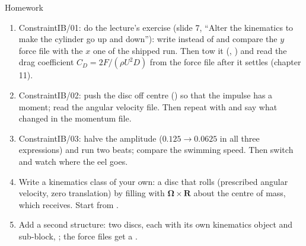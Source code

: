 \documentclass[aspectratio=169,11pt]{beamer}
\begin{document}
\begin{frame}{Homework}
\label{fr:hw}
\footnotesize
\begin{enumerate}
  \item ConstraintIB/01: do the lecture's exercise (slide 7, ``Alter the kinematics to make the cylinder go up and down''): write \code{[0][1][k]} instead of \code{[0][0][k]} and compare the $y$ force file with the $x$ one of the shipped run. Then tow it (, ) and read the drag coefficient $C_D = 2F/(\rho U^2 D)$ from the force file after it settles (chapter 11).
  \item ConstraintIB/02: push the disc off centre () so that the impulse has a moment; read the angular velocity file. Then repeat with  and say what changed in the momentum file.
  \item ConstraintIB/03: halve the amplitude ($0.125 \to 0.0625$ in all three expressions) and run two beats; compare the swimming speed. Then switch  and watch where the eel goes.
  \item Write a kinematics class of your own: a disc that rolls (prescribed angular velocity, zero translation) by filling  with $\boldsymbol{\Omega}\times\mathbf{R}$ about the centre of mass, which  receives. Start from .
  \item Add a second structure: two discs, each with its own kinematics object and sub-block, ; the force files get a .
\end{enumerate}
\end{frame}
\end{document}
